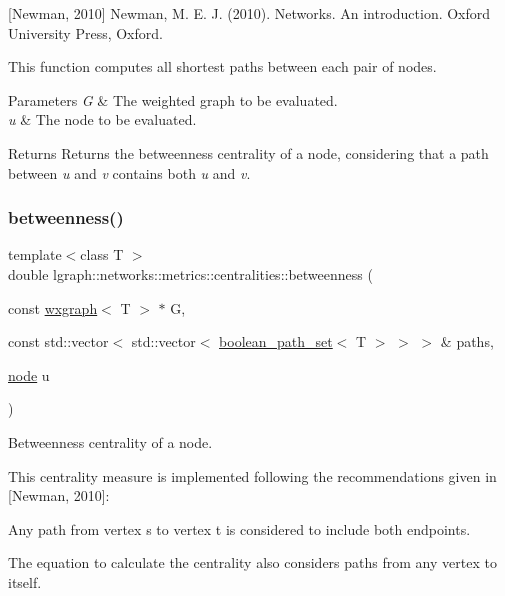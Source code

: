 \mbox{[}Newman, 2010\mbox{]} Newman, M. E. J. (2010). Networks. An introduction. Oxford University Press, Oxford.

This function computes all shortest paths between each pair of nodes.


\begin{DoxyParams}{Parameters}
{\em G} & The weighted graph to be evaluated. \\
\hline
{\em u} & The node to be evaluated. \\
\hline
\end{DoxyParams}
\begin{DoxyReturn}{Returns}
Returns the betweenness centrality of a node, considering that a path between {\itshape u} and {\itshape v} contains both {\itshape u} and {\itshape v}. 
\end{DoxyReturn}
\mbox{\label{namespacelgraph_1_1networks_1_1metrics_1_1centralities_a22d289500772bb1c1c40f705f8cfcdf0}} 
\subsubsection{\texorpdfstring{betweenness()}{betweenness()}\hspace{0.1cm}{\footnotesize\ttfamily [2/8]}}
{\footnotesize\ttfamily template$<$class T $>$ \\
double lgraph\+::networks\+::metrics\+::centralities\+::betweenness (\begin{DoxyParamCaption}\item[{const \hyperlink{classlgraph_1_1wxgraph}{wxgraph}$<$ T $>$ $\ast$}]{G,  }\item[{const std\+::vector$<$ std\+::vector$<$ \hyperlink{namespacelgraph_afad432931ba600ab1628d5c9595986c5}{boolean\+\_\+path\+\_\+set}$<$ T $>$ $>$ $>$ \&}]{paths,  }\item[{\hyperlink{namespacelgraph_a397169dd66adf725210a30fb7251773e}{node}}]{u }\end{DoxyParamCaption})}



Betweenness centrality of a node. 

This centrality measure is implemented following the recommendations given in \mbox{[}Newman, 2010\mbox{]}\+:
\begin{DoxyItemize}
\item Any path from vertex \textquotesingle{}s\textquotesingle{} to vertex \textquotesingle{}t\textquotesingle{} is considered to include both endpoints.
\item The equation to calculate the centrality also considers paths from any vertex to itself.
\end{DoxyItemize}

